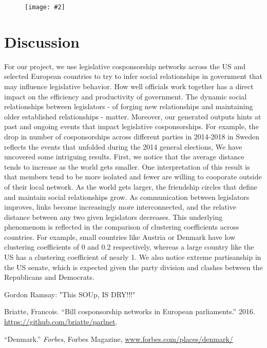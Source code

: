 \documentclass[12pt]{article}
\newcommand{\image}[4][0.6]{
  \begin{figure}[H]
    \centering
    \texttt{[image: \#2]}
    \begin{center}
      \caption[(details)]{\textbf{#4}\label{fig:#3}}
    \end{center}
    \vspace{-2em}
  \end{figure}}
\begin{document}
\begin{multicols*}{2}
\image[0.3]{../plots/assortativity/all_countries.pdf}{}{}
 

\section{Discussion}
For our project, we use legislative cosponsorship networks across the US and selected European countries to try to infer social relationships in government that may influence legislative behavior. How well officials work together has a direct impact on the efficiency and productivity of government. The dynamic social relationships between legislators - of forging new relationships and maintaining older established relationships - matter. Moreover, our generated outputs hints at past and ongoing events that impact legislative cosponsorships. For example, the drop in number of cosponsorships across different parties in 2014-2018 in Sweden reflects the events that unfolded during the 2014 general elections, 
We have uncovered some intriguing results. First, we notice that the average distance tends to increase as the world gets smaller. One interpretation of this result is that members tend to be more isolated and fewer are willing to cooporate outside of their local network. As the world gets larger, the friendship circles that define and maintain social relationships grow. As communication between legislators improves, links become increasingly more interconnected, and the relative distance between any two given legislators decreases. This underlying phenomenom is reflected in the comparison of clustering coefficients across countries. For example, small countries like Austria or Denmark have low clustering coefficients of 0 and 0.2 respectively, whereas a large country like the US has a clustering coefficient of nearly 1. 
We also notice extreme partisanship in the US senate, which is expected given the party division and clashes between the Republicans and Democrats. 

Gordon Ramsay: "This SOUp, IS DRY!!!"

\begin{thebibliography}{9}

 Briatte, Francois. ``Bill cosponsorship networks in European parliaments.'' 2016. \url{https://github.com/briatte/parlnet}.

 ``Denmark.'' \emph{Forbes}, Forbes Magazine, \url{www.forbes.com/places/denmark/}


\end{thebibliography}
\end{multicols*}
\end{document}
